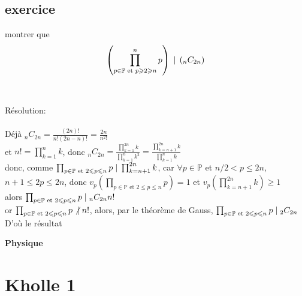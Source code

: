 \documentclass{article}
\begin{document}
\subsection{exercice}

montrer que $$\left({\prod_{p \in \mathbb{P} \text{ et } p \geqslant 2 \geqslant n}^{n}p}\right) \hspace{1mm} | \hspace{1mm} \left({_nC_{2n}}\right)$$ \\ \\

Résolution: \\ \\

Déjà $_nC_{2n} = \frac{(2n)!}{n!(2n - n)!} = \frac{2n}{n^2 !}$ \\
et $n! = \prod_{k=1}^{n} k$, donc $_nC_{2n} = \frac{\prod_{k=1}^{2n} k}{\prod_{k=1}^{n} k^2} = \frac{\prod_{k = n+1}^{2n} k}{\prod_{k=1}^{n} k}$ \\
donc, comme $\prod_{p \in \mathbb{P} \text{ et } 2 \leqslant p \leqslant n} p \hspace{1mm} | \hspace{1mm} \prod_{k=n+1}^{2n} k $, car $\forall p \in \mathbb{P} $ et $ n/2 < p \leqslant 2n$, $n+1 \leqslant2p \leqslant 2n$, donc $v_p\left(\prod_{p \in \mathbb{P} \text{ et } 2 \leqslant p \leqslant n} p \right) = 1$ et $v_p \left( \prod_{k=n+1}^{2n} k \right) \geqslant 1$ \\
alors $\prod_{p \in \mathbb{P} \text{ et } 2 \leqslant p \leqslant n} p \hspace{1mm} | \hspace{1mm} _nC_{2n} n!$ \\
or $\prod_{p \in \mathbb{P} \text{ et } 2 \leqslant p \leqslant n} p \not | \hspace{1mm} n!$, alors, par le théorème de Gauss, $\prod_{p \in \mathbb{P} \text{ et } 2 \leqslant p \leqslant n} p \hspace{1mm} | \hspace{1mm} _2C_{2n}$ \\

D'où le résultat



\begin{center}
\textbf{\large Physique}
\end{center} \vspace{0.2cm}

\section{Kholle 1}
\end{document}
